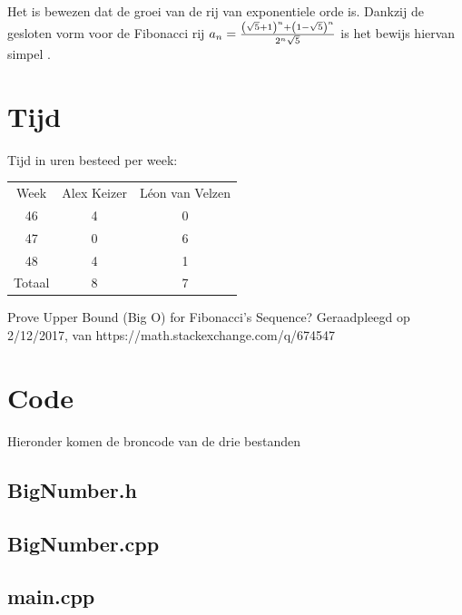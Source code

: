 \documentclass[10pt]{article}
\begin{document}
Het is bewezen dat de groei van de rij van exponentiele orde is. Dankzij de gesloten vorm voor de Fibonacci rij $a_n={{\left(\sqrt{5}+1\right)^{n}+\left(1-\sqrt{5}\right)^{n}}\over{2^{n}\sqrt{5}}}$ is het bewijs hiervan simpel \cite{proof}.

\section{Tijd}

Tijd in uren besteed per week:

\begin{center}
\begin{tabular}{ |c|c|c| }
\hline
Week & Alex Keizer & L\'{e}on van Velzen \\
46 & 4 & 0 \\
47 & 0 & 6 \\
48 & 4 & 1 \\ 
\hline
Totaal & 8 & 7 \\
\hline
\end{tabular}
\end{center}

\begin{thebibliography}{9}
     Prove Upper Bound (Big O) for Fibonacci's Sequence? Geraadpleegd op 2/12/2017, van https://math.stackexchange.com/q/674547
\end{thebibliography}

\section*{Code}
Hieronder komen de broncode van de drie bestanden
\subsection*{BigNumber.h}

\subsection*{BigNumber.cpp}

\subsection*{main.cpp}

\end{document}
